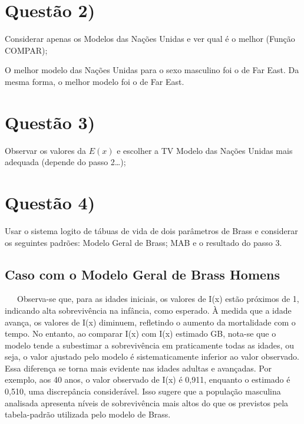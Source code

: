 \documentclass[
  12pt,
  a4paper,
]{scrreprt}
\begin{document}
\section{Questão 2)}\label{questuxe3o-2}

Considerar apenas os Modelos das Nações Unidas e ver qual é o melhor
(Função COMPAR);

\vspace{12pt}

O melhor modelo das Nações Unidas para o sexo masculino foi o de Far
East. Da mesma forma, o melhor modelo foi o de Far East.

\section{Questão 3)}\label{questuxe3o-3}

Observar os valores da \(E\left(x\right)\) e escolher a TV Modelo das
Nações Unidas mais adequada (depende do passo 2\ldots);

\section{Questão 4)}\label{questuxe3o-4}

Usar o sistema logito de tábuas de vida de dois parâmetros de Brass e
considerar os seguintes padrões: Modelo Geral de Brass; MAB e o
resultado do passo 3.

\subsection{Caso com o Modelo Geral de Brass
Homens}\label{caso-com-o-modelo-geral-de-brass-homens}

~~~Observa-se que, para as idades iniciais, os valores de I(x) estão
próximos de 1, indicando alta sobrevivência na infância, como esperado.
À medida que a idade avança, os valores de I(x) diminuem, refletindo o
aumento da mortalidade com o tempo. No entanto, ao comparar I(x) com
I(x) estimado GB, nota-se que o modelo tende a subestimar a
sobrevivência em praticamente todas as idades, ou seja, o valor ajustado
pelo modelo é sistematicamente inferior ao valor observado. Essa
diferença se torna mais evidente nas idades adultas e avançadas. Por
exemplo, aos 40 anos, o valor observado de I(x) é 0,911, enquanto o
estimado é 0,510, uma discrepância considerável. Isso sugere que a
população masculina analisada apresenta níveis de sobrevivência mais
altos do que os previstos pela tabela-padrão utilizada pelo modelo de
Brass.
\end{document}
